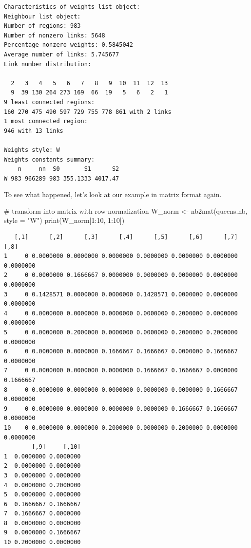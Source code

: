 \documentclass[
  letterpaper,
  DIV=11,
  numbers=noendperiod]{scrreprt}
\newenvironment{Shaded}{\begin{snugshade}}{\end{snugshade}}
\newcommand{\AttributeTok}[1]{\textcolor[rgb]{0.40,0.45,0.13}{#1}}
\newcommand{\CommentTok}[1]{\textcolor[rgb]{0.37,0.37,0.37}{#1}}
\newcommand{\DecValTok}[1]{\textcolor[rgb]{0.68,0.00,0.00}{#1}}
\newcommand{\FunctionTok}[1]{\textcolor[rgb]{0.28,0.35,0.67}{#1}}
\newcommand{\NormalTok}[1]{\textcolor[rgb]{0.00,0.23,0.31}{#1}}
\newcommand{\OtherTok}[1]{\textcolor[rgb]{0.00,0.23,0.31}{#1}}
\newcommand{\SpecialCharTok}[1]{\textcolor[rgb]{0.37,0.37,0.37}{#1}}
\newcommand{\StringTok}[1]{\textcolor[rgb]{0.13,0.47,0.30}{#1}}
\begin{document}
\begin{verbatim}
Characteristics of weights list object:
Neighbour list object:
Number of regions: 983 
Number of nonzero links: 5648 
Percentage nonzero weights: 0.5845042 
Average number of links: 5.745677 
Link number distribution:

  2   3   4   5   6   7   8   9  10  11  12  13 
  9  39 130 264 273 169  66  19   5   6   2   1 
9 least connected regions:
160 270 475 490 597 729 755 778 861 with 2 links
1 most connected region:
946 with 13 links

Weights style: W 
Weights constants summary:
    n     nn  S0       S1      S2
W 983 966289 983 355.1333 4017.47
\end{verbatim}

To see what happened, let's look at our example in matrix format again.

\begin{Shaded}
\begin{Highlighting}[]
\CommentTok{\# transform into matrix with row{-}normalization}
\NormalTok{W\_norm }\OtherTok{\textless{}{-}} \FunctionTok{nb2mat}\NormalTok{(queens.nb, }\AttributeTok{style =} \StringTok{"W"}\NormalTok{)}
\FunctionTok{print}\NormalTok{(W\_norm[}\DecValTok{1}\SpecialCharTok{:}\DecValTok{10}\NormalTok{, }\DecValTok{1}\SpecialCharTok{:}\DecValTok{10}\NormalTok{])}
\end{Highlighting}
\end{Shaded}

\begin{verbatim}
   [,1]      [,2]      [,3]      [,4]      [,5]      [,6]      [,7]      [,8]
1     0 0.0000000 0.0000000 0.0000000 0.0000000 0.0000000 0.0000000 0.0000000
2     0 0.0000000 0.1666667 0.0000000 0.0000000 0.0000000 0.0000000 0.0000000
3     0 0.1428571 0.0000000 0.0000000 0.1428571 0.0000000 0.0000000 0.0000000
4     0 0.0000000 0.0000000 0.0000000 0.0000000 0.2000000 0.0000000 0.0000000
5     0 0.0000000 0.2000000 0.0000000 0.0000000 0.2000000 0.2000000 0.0000000
6     0 0.0000000 0.0000000 0.1666667 0.1666667 0.0000000 0.1666667 0.0000000
7     0 0.0000000 0.0000000 0.0000000 0.1666667 0.1666667 0.0000000 0.1666667
8     0 0.0000000 0.0000000 0.0000000 0.0000000 0.0000000 0.1666667 0.0000000
9     0 0.0000000 0.0000000 0.0000000 0.0000000 0.1666667 0.1666667 0.0000000
10    0 0.0000000 0.0000000 0.2000000 0.0000000 0.2000000 0.0000000 0.0000000
        [,9]     [,10]
1  0.0000000 0.0000000
2  0.0000000 0.0000000
3  0.0000000 0.0000000
4  0.0000000 0.2000000
5  0.0000000 0.0000000
6  0.1666667 0.1666667
7  0.1666667 0.0000000
8  0.0000000 0.0000000
9  0.0000000 0.1666667
10 0.2000000 0.0000000
\end{verbatim}
\end{document}
